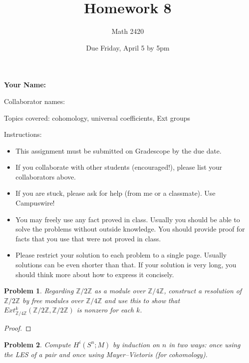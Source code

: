 \documentclass[11pt]{article}
\author{Math 2420}
\date{Due Friday, April 5 by 5pm}
\title{Homework 8}
\newtheorem{problem}{Problem}
\begin{document}
\maketitle

{\bf\Large Your Name:} 

Collaborator names: 


\vspace{.3in}
Topics covered: cohomology, universal coefficients, Ext groups

Instructions: 
\begin{itemize}
\item This assignment must be submitted on Gradescope by the due date. 
\item If you collaborate with other students (encouraged!), please list your collaborators above. 
\item If you are stuck, please ask for help (from me or a classmate). Use Campuswire!  
\item You may freely use any fact proved in class. Usually you should be able to solve the problems without outside knowledge. You should provide proof for facts that you use that were not proved in class. 
\item Please restrict your solution to each problem to a single page. Usually solutions can be even shorter than that. If your solution is very long, you should think more about how to express it concisely.
\end{itemize}
\pagebreak 


\pagebreak 


\begin{problem}
Regarding $\mathbb Z/2\mathbb Z$ as a module over $\mathbb Z/4\mathbb Z$, construct a resolution of $\mathbb Z/2\mathbb Z$ by free modules over $\mathbb Z/4\mathbb Z$ and use this to show that $Ext_{\mathbb Z/4\mathbb Z}^k(\mathbb Z/2\mathbb Z,\mathbb Z/2\mathbb Z)$ is nonzero for each $k$. 
\end{problem}

\begin{proof}

\end{proof} 


\pagebreak 



\begin{problem}
Compute $H^i(S^n;M)$ by induction on $n$ in two ways: once using the LES of a pair and once using Mayer--Vietoris (for cohomology). 
\end{problem}
\end{document}
